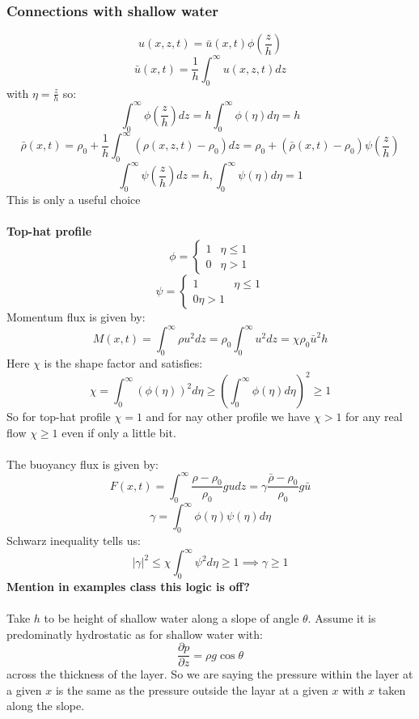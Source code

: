\documentclass{article}
\begin{document}
\subsubsection{Connections with shallow water}
$$
u(x, z,t) = \bar u( x,t) \phi(\frac{z}{h})
$$
$$
\bar u(x,t) = \frac{1}{h} \int_0^{\infty} u(x,z,t) dz
$$
with $\eta = \frac{z}{h}$ so:
$$
 \int^{\infty}_0 \phi(\frac{z}{h}) dz = h \int^{\infty}_0 \phi(\eta) d\eta = h
$$
$$
\bar \rho(x,t) = \rho_0 + \frac{1}{h} \int^{\infty}_0( \rho(x,z,t) - \rho_0) dz = \rho_0 + ( \bar \rho(x,t) - \rho_0) \psi( \frac{z}{h})
$$
$$
 \int^{\infty}_0 \psi( \frac{z}{h}) dz = h, \int_0^{\infty} \psi(\eta) d \eta =1
$$
This is only a useful choice\\\\
\textbf{Top-hat profile}
$$
 \phi = \begin{cases} 1 & \eta \leq 1\\ 0 & \eta >1 \end{cases}
$$
$$
 \psi = \begin{cases} 1 & \eta \leq 1 \\ 0 \eta >1 \end{cases}
$$
Momentum flux  is given by:
$$
 M(x,t) = \int_0^{\infty} \rho u^2 dz = \rho_0 \int_0^{\infty} u^2 dz = \chi \rho_0 \bar u^2 h
$$
Here $\chi$ is the shape factor and satisfies:
$$
 \chi = \int_0^{\infty} ( \phi(\eta))^2 d \eta \geq ( \int_0^{\infty} \phi(\eta) d\eta)^2 \geq 1
$$
So for top-hat profile $\chi = 1$ and for nay other profile we have $\chi >1$ for any real flow $\chi \geq 1$ even if only a little bit.\\\\
The buoyancy flux is given by:
$$
 F(x,t) = \int_0^{\infty} \frac{\rho - \rho_0}{\rho_0} g u dz = \gamma \frac{\bar \rho - \rho_0}{\rho_0} g \bar u
$$
$$
 \gamma = \int^{\infty}_0 \phi(\eta) \psi(\eta) d \eta
$$
Schwarz inequality tells us:
$$
 |\gamma|^2 \leq \chi \int^{\infty}_0 \psi^2 d\eta \geq 1 \implies \gamma \geq 1
$$
\textbf{Mention in examples class this logic is off?}\\\\
Take $h$ to be height of shallow water along a slope of angle $\theta$. Assume it is predominatly hydrostatic as for shallow water with:
$$
\frac{\partial p}{\partial z} = \rho g \cos \theta
$$
across the thickness of the layer. So we are saying the pressure within the layer at a given $x$ is the same as the pressure outside the layar at a given $x$ with $x$ taken along the slope.\\\\
\end{document}
